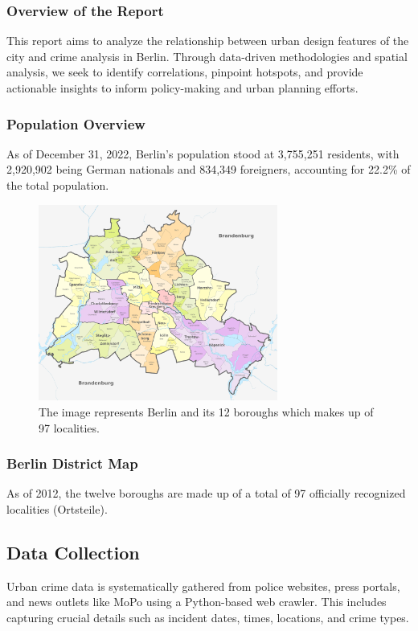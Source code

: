 \subsubsection{Overview of the Report}
This report aims to analyze the relationship between urban design features of the city and crime analysis in Berlin. Through data-driven methodologies and spatial analysis, we seek to identify correlations, pinpoint hotspots, and provide actionable insights to inform policy-making and urban planning efforts.



\subsubsection{Population Overview}
As of December 31, 2022, Berlin's population stood at 3,755,251 residents, with 2,920,902 being German nationals and 834,349 foreigners, accounting for 22.2\% of the total population.

\begin{figure}[h]
\includegraphics[width=0.7\textwidth]{./figures/intro_rishabh/1_0.png}
    \caption{The image represents Berlin and its 12 boroughs which makes up of 97 localities.}
    \label{fig:districts}
\end{figure}



\subsubsection{Berlin District Map}
As of 2012, the twelve boroughs are made up of a total of 97 officially recognized localities (Ortsteile).

\subsection{Data Collection}
Urban crime data is systematically gathered from police websites, press portals, and news outlets like MoPo using a Python-based web crawler. This includes capturing crucial details such as incident dates, times, locations, and crime types.

